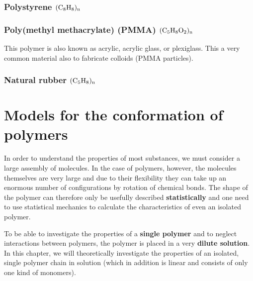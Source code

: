 \documentclass[
  letterpaper,
  enabledeprecatedfontcommands]{report}
\begin{document}
\subsubsection*{\texorpdfstring{Polystyrene
\(\rm (C_8H_8)_n\)}{Polystyrene \textbackslash rm (C\_8H\_8)\_n}}\label{polystyrene-rm-c_8h_8_n}

\subsubsection*{\texorpdfstring{Poly(methyl methacrylate) (PMMA)
\(\rm (C_5H_8O_2)_n\)}{Poly(methyl methacrylate) (PMMA) \textbackslash rm (C\_5H\_8O\_2)\_n}}\label{polymethyl-methacrylate-pmma-rm-c_5h_8o_2_n}

This polymer is also known as acrylic, acrylic glass, or plexiglass.
This a very common material also to fabricate colloids (PMMA particles).

\subsubsection*{\texorpdfstring{Natural rubber
\(\rm (C_5H_8)_n\)}{Natural rubber \textbackslash rm (C\_5H\_8)\_n}}\label{natural-rubber-rm-c_5h_8_n}

\section{Models for the conformation of
polymers}\label{models-for-the-conformation-of-polymers}

In order to understand the properties of most substances, we must
consider a large assembly of molecules. In the case of polymers,
however, the molecules themselves are very large and due to their
flexibility they can take up an enormous number of configurations by
rotation of chemical bonds. The shape of the polymer can therefore only
be usefully described \textbf{statistically} and one need to use
statistical mechanics to calculate the characteristics of even an
isolated polymer.

To be able to investigate the properties of a \textbf{single polymer}
and to neglect interactions between polymers, the polymer is placed in a
very \textbf{dilute solution}. In this chapter, we will theoretically
investigate the properties of an isolated, single polymer chain in
solution (which in addition is linear and consists of only one kind of
monomers).
\end{document}
